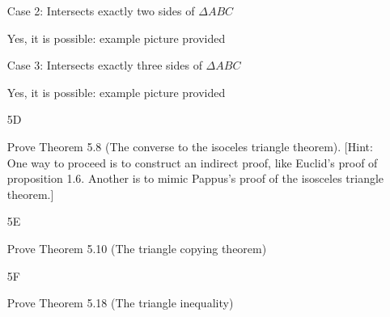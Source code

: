 \documentclass[11pt]{article}
\begin{document}
\begin{itemize}
		Case 2: Intersects exactly two sides of $\Delta ABC$

		Yes, it is possible: example picture provided

		Case 3: Intersects exactly three sides of $\Delta ABC$

		Yes, it is possible: example picture provided

	\item[5D]

		Prove Theorem 5.8 (The converse to the isoceles triangle theorem). [Hint: One way to proceed is to construct an indirect proof, like Euclid's proof of proposition 1.6. Another is to mimic Pappus's proof of the isosceles triangle theorem.]

	\item[5E]

		Prove Theorem 5.10 (The triangle copying theorem)

	\item[5F]

		Prove Theorem 5.18 (The triangle inequality)
			
\end{itemize}
\end{document}
